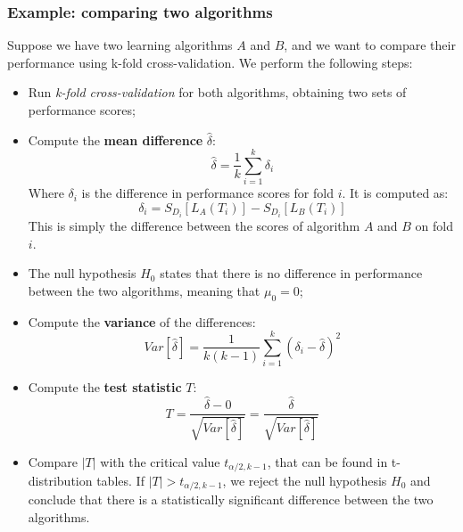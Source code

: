 \subsubsection{Example: comparing two algorithms}
Suppose we have two learning algorithms $A$ and $B$, and we want to compare their performance using k-fold cross-validation.
We perform the following steps:
\begin{itemize}
	\item Run \textit{k-fold cross-validation} for both algorithms, obtaining two sets of performance scores;
	\item Compute the \textbf{mean difference} $\hat{\delta}$:
	\begin{equation*}
		\hat{\delta} = \frac{1}{k} \sum_{i=1}^{k} \delta_i
	\end{equation*}
	Where $\delta_i$ is the difference in performance scores for fold $i$. It is computed as:
	\begin{equation*}
		\delta_i = S_{D_i}[L_A(T_i)] - S_{D_i}[L_B(T_i)]
	\end{equation*}
	This is simply the difference between the scores of algorithm $A$ and $B$ on fold $i$.
	\item The null hypothesis $H_0$ states that there is no difference in performance between the two algorithms,
	meaning that $\mu_0 = 0$;
	\item Compute the \textbf{variance} of the differences:
	\begin{equation*}
		Var[\hat{\delta}] = \frac{1}{k(k-1)} \sum_{i=1}^{k} (\delta_i - \hat{\delta})^2
	\end{equation*}
	\item Compute the \textbf{test statistic} $T$:
	\begin{equation*}
		T = \frac{\hat{\delta} - 0}{\sqrt{Var[\hat{\delta}]}} = \frac{\hat{\delta}}{\sqrt{Var[\hat{\delta}]}}
	\end{equation*}
	\item Compare $|T|$ with the critical value $t_{\alpha/2, k-1}$, that can be found in t-distribution tables.
	If $|T| > t_{\alpha/2, k-1}$, we reject the null hypothesis $H_0$ and conclude that there is a statistically significant difference
	between the two algorithms.
\end{itemize}
